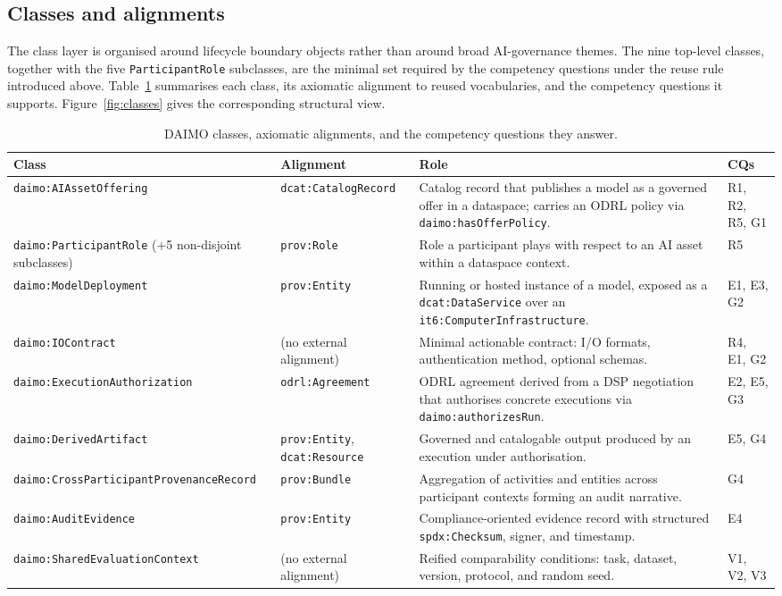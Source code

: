 \documentclass[11pt,a4paper]{article}
\newcommand{\code}[1]{\texttt{#1}}
\begin{document}
\subsection{Classes and alignments}\label{sec:classes}

The class layer is organised around lifecycle boundary objects rather than around broad AI-governance themes. The nine top-level classes, together with the five \code{ParticipantRole} subclasses, are the minimal set required by the competency questions under the reuse rule introduced above. Table~\ref{tab:classes} summarises each class, its axiomatic alignment to reused vocabularies, and the competency questions it supports. Figure~\ref{fig:classes} gives the corresponding structural view.

\begin{table}[t]
\small\sf\centering
\caption{DAIMO classes, axiomatic alignments, and the competency questions they answer.\label{tab:classes}}
\begin{tabular}{@{}p{4cm}p{3cm}p{6cm}p{2.2cm}@{}}
\toprule
\textbf{Class} & \textbf{Alignment} & \textbf{Role} & \textbf{CQs} \\
\midrule
\code{daimo:AIAssetOffering} & \code{dcat:CatalogRecord} & Catalog record that publishes a model as a governed offer in a dataspace; carries an ODRL policy via \code{daimo:hasOfferPolicy}. & R1, R2, R5, G1 \\
\code{daimo:ParticipantRole} \newline (+5 non-disjoint subclasses) & \code{prov:Role} & Role a participant plays with respect to an AI asset within a dataspace context. & R5 \\
\code{daimo:ModelDeployment} & \code{prov:Entity} & Running or hosted instance of a model, exposed as a \code{dcat:DataService} over an \code{it6:ComputerInfrastructure}. & E1, E3, G2 \\
\code{daimo:IOContract} & (no external alignment) & Minimal actionable contract: I/O formats, authentication method, optional schemas. & R4, E1, G2 \\
\code{daimo:ExecutionAuthorization} & \code{odrl:Agreement} & ODRL agreement derived from a DSP negotiation that authorises concrete executions via \code{daimo:authorizesRun}. & E2, E5, G3 \\
\code{daimo:DerivedArtifact} & \code{prov:Entity}, \code{dcat:Resource} & Governed and catalogable output produced by an execution under authorisation. & E5, G4 \\
\code{daimo:CrossParticipantProvenanceRecord} & \code{prov:Bundle} & Aggregation of activities and entities across participant contexts forming an audit narrative. & G4 \\
\code{daimo:AuditEvidence} & \code{prov:Entity} & Compliance-oriented evidence record with structured \code{spdx:Checksum}, signer, and timestamp. & E4 \\
\code{daimo:SharedEvaluationContext} & (no external alignment) & Reified comparability conditions: task, dataset, version, protocol, and random seed. & V1, V2, V3 \\
\bottomrule
\end{tabular}
\end{table}
\end{document}
